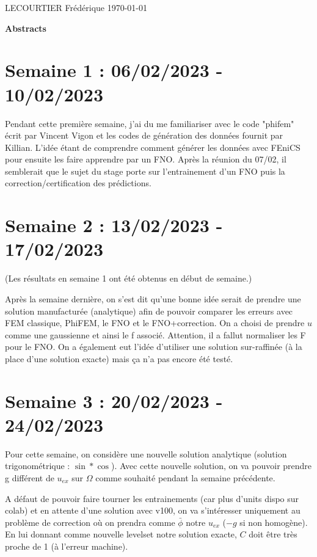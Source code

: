 \documentclass[french]{article}
\begin{document}
	LECOURTIER Frédérique \hfill \today
	\begin{center}
		\Large\textbf{{Abstracts}}
	\end{center}
\section{Semaine 1 : 06/02/2023 - 10/02/2023}
	Pendant cette première semaine, j'ai du me familiariser avec le code "phifem" écrit par Vincent Vigon et les codes de génération des données fournit par Killian. L'idée étant de comprendre comment générer les données avec FEniCS pour ensuite les faire apprendre par un FNO. Après la réunion du 07/02, il semblerait que le sujet du stage porte sur l'entrainement d'un FNO puis la correction/certification des prédictions.
\section{Semaine 2 : 13/02/2023 - 17/02/2023}
	(Les résultats en semaine 1 ont été obtenus en début de semaine.)
	
	Après la semaine dernière, on s'est dit qu'une bonne idée serait de prendre une solution manufacturée (analytique) afin de pouvoir comparer les erreurs avec FEM classique, PhiFEM, le FNO et le FNO+correction. On a choisi de prendre $u$ comme une gaussienne et ainsi le f associé. Attention, il a fallut normaliser les F pour le FNO. On a également eut l'idée d'utiliser une solution sur-raffinée (à la place d'une solution exacte) mais ça n'a pas encore été testé.
\section{Semaine 3 : 20/02/2023 - 24/02/2023}
	Pour cette semaine, on considère une nouvelle solution analytique (solution trigonométrique : $\sin*\cos$). Avec cette nouvelle solution, on va pouvoir prendre g différent de $u_{ex}$ sur $\Omega$ comme souhaité pendant la semaine précédente. 
	
	A défaut de pouvoir faire tourner les entrainements (car plus d'units dispo sur colab) et en attente d'une solution avec v100, on va s'intéresser uniquement au problème de correction où on prendra comme $\bar{\phi}$ notre $u_{ex}$ ($-g$ si non homogène). En lui donnant comme nouvelle levelset notre solution exacte, $C$ doit être très proche de 1 (à l'erreur machine).  
\end{document}
